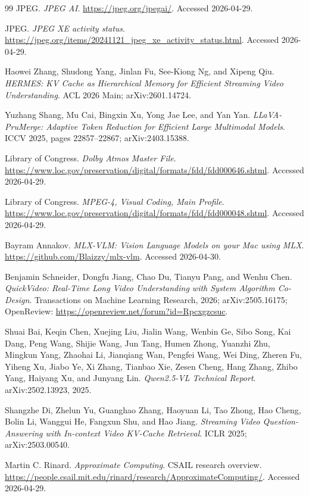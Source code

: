 \begin{thebibliography}{99}
JPEG. \emph{JPEG AI}. \url{https://jpeg.org/jpegai/}. Accessed 2026-04-29.

JPEG. \emph{JPEG XE activity status}.
\url{https://jpeg.org/items/20241121_jpeg_xe_activity_status.html}. Accessed
2026-04-29.

Haowei Zhang, Shudong Yang, Jinlan Fu, See-Kiong Ng, and Xipeng Qiu.
\emph{HERMES: KV Cache as Hierarchical Memory for Efficient Streaming Video
Understanding}. ACL 2026 Main; arXiv:2601.14724.

Yuzhang Shang, Mu Cai, Bingxin Xu, Yong Jae Lee, and Yan Yan.
\emph{LLaVA-PruMerge: Adaptive Token Reduction for Efficient Large Multimodal
Models}. ICCV 2025, pages 22857--22867; arXiv:2403.15388.

Library of Congress. \emph{Dolby Atmos Master File}.
\url{https://www.loc.gov/preservation/digital/formats/fdd/fdd000646.shtml}.
Accessed 2026-04-29.

Library of Congress. \emph{MPEG-4, Visual Coding, Main Profile}.
\url{https://www.loc.gov/preservation/digital/formats/fdd/fdd000048.shtml}.
Accessed 2026-04-29.

Bayram Annakov. \emph{MLX-VLM: Vision Language Models on your Mac using MLX}.
\url{https://github.com/Blaizzy/mlx-vlm}. Accessed 2026-04-30.

Benjamin Schneider, Dongfu Jiang, Chao Du, Tianyu Pang, and Wenhu Chen.
\emph{QuickVideo: Real-Time Long Video Understanding with System Algorithm
Co-Design}. Transactions on Machine Learning Research, 2026;
arXiv:2505.16175; OpenReview:
\url{https://openreview.net/forum?id=Rpcxgzcsuc}.

Shuai Bai, Keqin Chen, Xuejing Liu, Jialin Wang, Wenbin Ge, Sibo Song, Kai
Dang, Peng Wang, Shijie Wang, Jun Tang, Humen Zhong, Yuanzhi Zhu, Mingkun
Yang, Zhaohai Li, Jianqiang Wan, Pengfei Wang, Wei Ding, Zheren Fu, Yiheng Xu,
Jiabo Ye, Xi Zhang, Tianbao Xie, Zesen Cheng, Hang Zhang, Zhibo Yang, Haiyang
Xu, and Junyang Lin.
\emph{Qwen2.5-VL Technical Report}. arXiv:2502.13923, 2025.

Shangzhe Di, Zhelun Yu, Guanghao Zhang, Haoyuan Li, Tao Zhong, Hao Cheng,
Bolin Li, Wanggui He, Fangxun Shu, and Hao Jiang.
\emph{Streaming Video Question-Answering with In-context Video KV-Cache
Retrieval}. ICLR 2025; arXiv:2503.00540.

Martin C. Rinard. \emph{Approximate Computing}. CSAIL research overview.
\url{https://people.csail.mit.edu/rinard/research/ApproximateComputing/}.
Accessed 2026-04-29.


\end{thebibliography}
